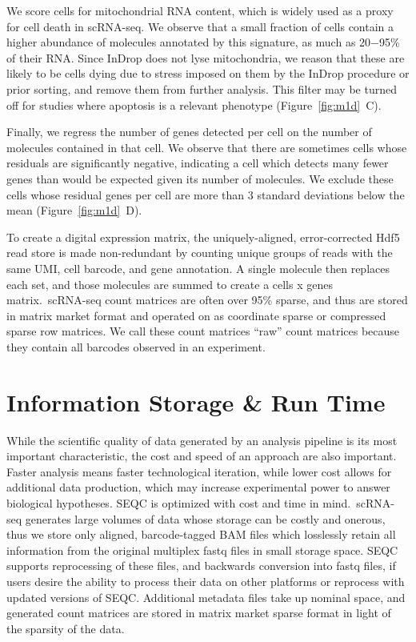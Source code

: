 We score cells for mitochondrial RNA content, which is widely used as a proxy for cell death in scRNA-seq. 
We observe that a small fraction of cells contain a higher abundance of molecules annotated by this signature, as much as 20−95\% of their RNA\@. 
Since InDrop does not lyse mitochondria, we reason that these are likely to be cells dying due to stress imposed on them by the InDrop procedure or prior sorting, and remove them from further analysis. %
This filter may be turned off for studies where apoptosis is a relevant phenotype (Figure~\ref{fig:m1d}~C).

Finally, we regress the number of genes detected per cell on the number of molecules contained in that cell. 
We observe that there are sometimes cells whose residuals are significantly negative, indicating a cell which detects many fewer genes than would be expected given its number of molecules. 
We exclude these cells whose residual genes per cell are more than 3 standard deviations
below the mean (Figure~\ref{fig:m1d}~D).

To create a digital expression matrix, the uniquely-aligned, error-corrected Hdf5 read store is made non-redundant by counting unique groups of reads with the same UMI, cell barcode, and gene annotation. 
A single molecule then replaces each set, and those molecules are summed to create a cells x genes matrix.\ 
scRNA-seq count matrices are often over 95\% sparse, and thus are stored in matrix market format and operated on as coordinate sparse or compressed sparse row matrices. 
We call these count matrices ``raw'' count matrices because they contain all barcodes observed in an experiment.

\section{Information Storage \& Run Time}

While the scientific quality of data generated by an analysis pipeline is its most important characteristic, the cost and speed of an approach are also important. 
Faster analysis means faster technological iteration, while lower cost allows for additional data production, which may increase experimental power to answer biological hypotheses. 
SEQC is optimized with cost and time in mind.\ 
scRNA-seq generates large volumes of data whose storage can be costly and onerous, thus we store only aligned, barcode-tagged BAM files which losslessly retain all information from the original multiplex fastq files in small storage space. 
SEQC supports reprocessing of these files, and backwards conversion into fastq files, if users desire the ability to process their data on other platforms or reprocess with updated versions of SEQC\@. 
Additional metadata files take up nominal space, and generated count matrices are stored in matrix market sparse format in light of the sparsity of the data. 

